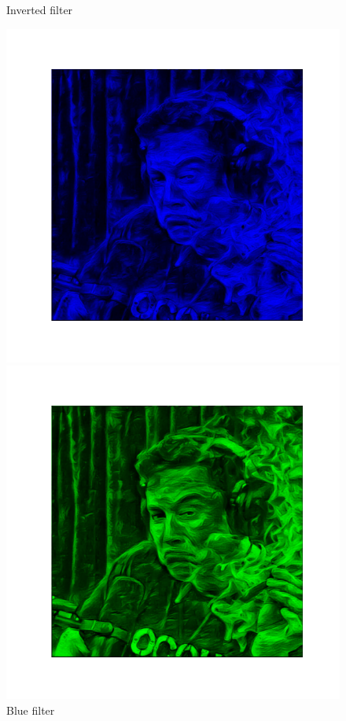 \documentclass{42-en}
\begin{document}
\begin{figure}[h!]
\begin{minipage}[c]{0.49\linewidth}
    \vspace{-50pt}
    \caption{Inverted filter}
  \end{minipage}
  \vspace{-20pt}
  \begin{minipage}[l]{0.49\linewidth}
    \includegraphics[scale=0.38]{assets/elon_blue.png}
    \vspace{-50pt}
    \caption{Blue filter}
  \end{minipage}
  \hfill
  \begin{minipage}[c]{0.49\linewidth}
    \includegraphics[scale=0.38]{assets/elon_green.png}

\end{minipage}
\end{figure}
\end{document}
